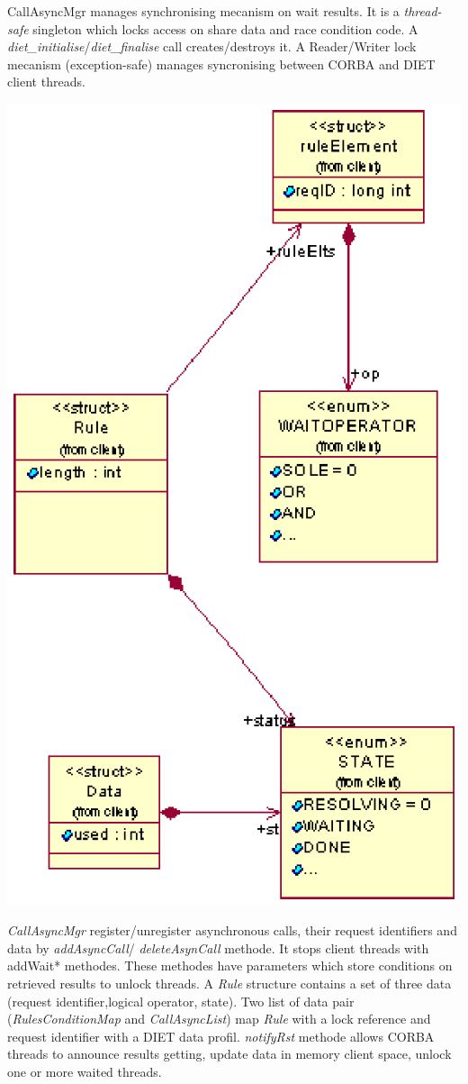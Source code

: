   CallAsyncMgr manages synchronising mecanism on wait results. It is a \emph{thread-safe}
  singleton which locks access on share data and race condition code. A
  \emph{diet\_initialise}/\emph{diet\_finalise} call creates/destroys it. A
  Reader/Writer lock mecanism (exception-safe) manages syncronising between
  CORBA and DIET client threads.

  \includegraphics{./fig/WaitRulesClassDiagram.ps}

  \emph{CallAsyncMgr} register/unregister asynchronous calls, their request
  identifiers and data by \emph{addAsyncCall}/ \emph{deleteAsynCall} methode.
  It stops client threads with addWait* methodes. These methodes have
  parameters which store conditions on retrieved results to unlock threads.
  A \emph{Rule} structure contains a set of three data (request identifier,logical operator, state).
  Two list of data pair (\emph{RulesConditionMap} and \emph{CallAsyncList}) map \emph{Rule} with a
  lock reference and request identifier with a DIET data
  profil. \emph{notifyRst} methode allows CORBA threads to announce results getting,
  update data in memory client space, unlock one or more waited threads.

